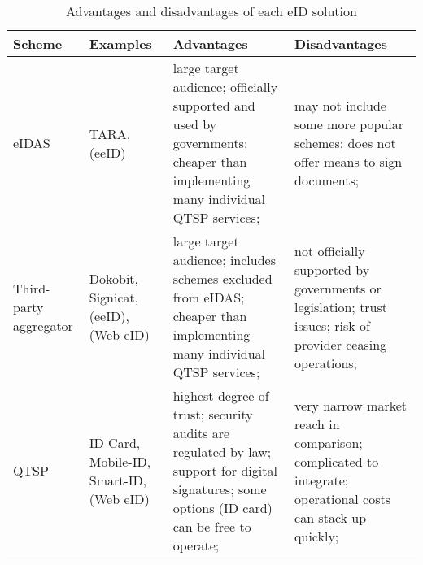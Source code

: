 \begin{table}[h]
    \centering
    \caption{Advantages and disadvantages of each eID solution}
    \begin{tabular}{p{2cm} | p{2cm} | p{4.4cm} | p{4.4cm}}
        \bf{Scheme}            & \bf{Examples}                           & \bf{Advantages}                                                                                                                                                          & \bf{Disadvantages}                                                                                                             \\
        \hline
        eIDAS                  & TARA, (eeID)                            & large target audience; \newline officially supported and used by governments; \newline cheaper than implementing many individual QTSP services;                          & may not include some more popular schemes; \newline does not offer means to sign documents;                                    \\
        \hline
        Third-party aggregator & Dokobit, Signicat, (eeID), (Web eID)    & large target audience; \newline includes schemes excluded from eIDAS; \newline cheaper than implementing many individual QTSP services;                                  & not officially supported by governments or legislation; \newline trust issues; \newline risk of provider ceasing operations;   \\
        \hline
        QTSP                   & ID-Card, Mobile-ID, Smart-ID, (Web eID) & highest degree of trust; \newline security audits are regulated by law; \newline support for digital signatures; \newline some options (ID card) can be free to operate; & very narrow market reach in comparison; \newline complicated to integrate; \newline operational costs can stack up quickly; \\
    \end{tabular}
    \label{tab:eid-advantages-disadvantages}
\end{table}

